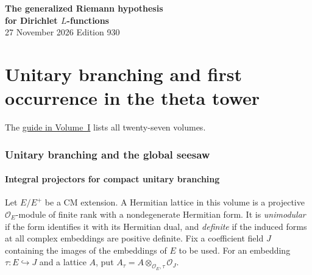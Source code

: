 \documentclass[a4paper,11pt]{article}
\theoremstyle{definition}
\theoremstyle{remark}
\numberwithin{equation}{section}
\newcommand{\OO}{\mathcal O}
\begin{document}
\setcounter{part}{13}
\thispagestyle{plain}\begin{center}
{\LARGE\bfseries The generalized Riemann hypothesis\\[2pt]for Dirichlet \(L\)-functions}\\[6pt]
{\small 27 November 2026 \quad\textperiodcentered\quad Edition 930}\end{center}
\part{Unitary branching and first occurrence in the theta tower}\label{part:XIV}
\begin{abstract}\noindent We follow a prescribed representation through the unitary theta correspondence. Branching, seesaw identities and terminal Hecke operators determine the rows used for the global lift, its first occurrence and the norms on the even core.\end{abstract}
\setcounter{section}{69}
\noindent The \hyperref[seriesguide]{guide in Volume~I} lists all twenty-seven volumes.
\begingroup\small\setlength{\parskip}{0pt}\tableofcontents\endgroup
\clearpage

\section{Unitary branching and the global seesaw}\label{nav:g-VI-0}\label{nav:volume-XIV}

\subsection{Integral projectors for compact unitary branching}\label{nav:I-37}
Let \(E/E^+\) be a CM extension. A Hermitian lattice in this volume is a projective \(\OO_E\)-module of finite rank with a nondegenerate Hermitian form. It is \emph{unimodular} if the form identifies it with its Hermitian dual, and \emph{definite} if the induced forms at all complex embeddings are positive definite. Fix a coefficient field \(J\) containing the images of the embeddings of \(E\) to be used. For an embedding \(\tau:E\hookrightarrow J\) and a lattice \(A\), put \(A_\tau=A\otimes_{\OO_E,\tau}\OO_J\).
\end{document}
